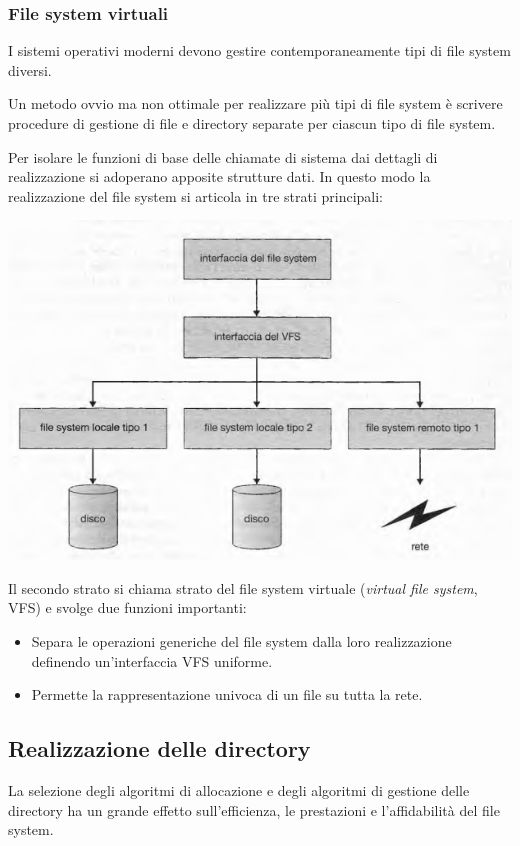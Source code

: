 \documentclass[11pt,a4paper]{article}
\begin{document}
{\subsubsection{File system virtuali}
I sistemi operativi moderni devono gestire contemporaneamente tipi di file system diversi.

Un metodo ovvio ma non ottimale per realizzare più tipi di file system è scrivere pro­cedure di gestione di file e directory separate per ciascun tipo di file system.

Per isolare le funzioni di base delle chiamate di sistema dai dettagli di realizzazione si
adoperano apposite strutture dati. In questo modo la realizzazione del file system si articola
in tre strati principali:
\begin{center}
  \includegraphics[scale=0.55]{img/0054.png}
\end{center}
Il secondo strato si chiama strato del file system virtuale (\emph{virtual file system}, VFS) e
svolge due funzioni importanti:
\begin{itemize}
  \item Separa le operazioni generiche del file system dalla loro realizzazione definendo un'in­terfaccia VFS uniforme.
  \item Permette la rappresentazione univoca di un file su tutta la rete.
\end{itemize}

\subsection{Realizzazione delle directory}
La selezione degli algoritmi di allocazione e degli algoritmi di gestione delle directory ha un
grande effetto sull'efficienza, le prestazioni e l'affidabilità del file system.

}
\end{document}
